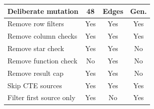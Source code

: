 \begin{tabular}{lccc}
\toprule
Deliberate mutation & 48 & Edges & Gen. \\
\midrule
Remove row filters & Yes & Yes & Yes \\
Remove column checks & Yes & Yes & Yes \\
Remove star check & Yes & Yes & No \\
Remove function check & No & Yes & No \\
Remove result cap & Yes & Yes & No \\
Skip CTE sources & Yes & Yes & Yes \\
Filter first source only & Yes & No & Yes \\
\bottomrule
\end{tabular}
